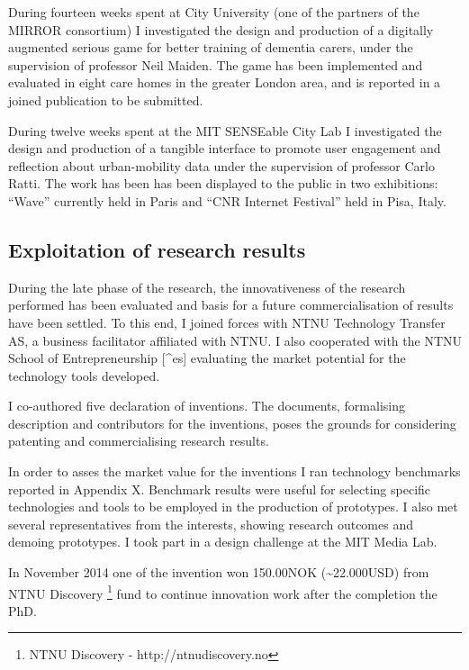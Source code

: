 During fourteen weeks spent at City University (one of the partners of
the MIRROR consortium) I investigated the design and production of a
digitally augmented serious game for better training of dementia carers,
under the supervision of professor Neil Maiden. The game has been
implemented and evaluated in eight care homes in the greater London
area, and is reported in a joined publication to be submitted.

During twelve weeks spent at the MIT SENSEable City Lab I investigated
the design and production of a tangible interface to promote user
engagement and reflection about urban-mobility data under the
supervision of professor Carlo Ratti. The work has been has been
displayed to the public in two exhibitions: ``Wave'' currently held in
Paris and ``CNR Internet Festival'' held in Pisa,
Italy.

\subsection{Exploitation of research
results}\label{exploitation-of-research-results}

During the late phase of the research, the innovativeness of the
research performed has been evaluated and basis for a future
commercialisation of results have been settled. To this end, I joined
forces with NTNU Technology Transfer AS, a business facilitator
affiliated with NTNU. I also cooperated with the NTNU School of
Entrepreneurship {[}\^{}es{]} evaluating the market potential for the
technology tools developed.

I co-authored five declaration of inventions. The documents, formalising
description and contributors for the inventions, poses the grounds for
considering patenting and commercialising research results.

In order to asses the market value for the inventions I ran technology
benchmarks reported in Appendix
X. Benchmark
results were useful for selecting specific technologies and tools to be
employed in the production of prototypes. I also met several
representatives from the interests, showing research outcomes and
demoing prototypes. I took part in a design challenge at the MIT Media
Lab.

In November 2014 one of the invention won 150.00NOK
(\textasciitilde{}22.000USD) from NTNU Discovery \footnote{NTNU
  Discovery - http://ntnudiscovery.no} fund to continue innovation work
after the completion the PhD.
